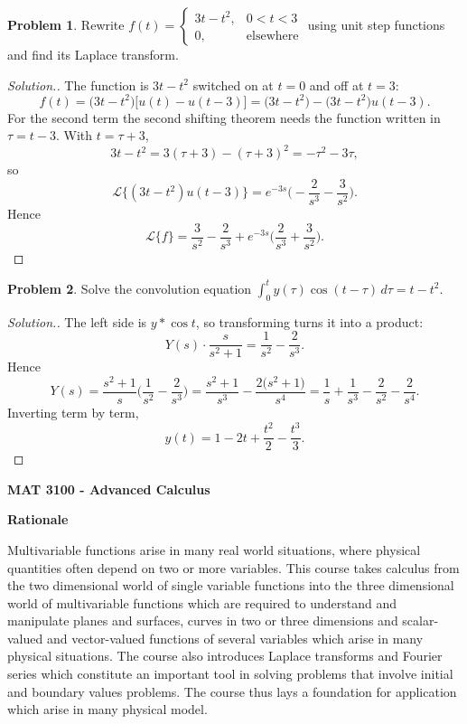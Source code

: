 \documentclass[11pt,a4paper]{article}
\theoremstyle{definition}
\newtheorem{problemx}{Problem}[subsection]
\newenvironment{problem}{\begin{problemx}}{\end{problemx}}
\newenvironment{solution}
  {\renewcommand{\qedsymbol}{}\begin{proof}[\textit{Solution}.]}
  {\end{proof}}
\begin{document}
\begin{problem}
Rewrite
$f(t) = \begin{cases}3t-t^2, & 0<t<3\\ 0, & \text{elsewhere}\end{cases}$
using unit step functions and find its Laplace transform.
\end{problem}
\begin{solution}
The function is $3t-t^2$ switched on at $t=0$ and off at $t=3$:
$$f(t) = \big(3t-t^2\big)\Big[u(t)-u(t-3)\Big]
= \big(3t-t^2\big) - \big(3t-t^2\big)u(t-3).$$
For the second term the second shifting theorem needs the function written in
$\tau = t-3$. With $t = \tau+3$,
$$3t-t^2 = 3(\tau+3)-(\tau+3)^2 = -\tau^2-3\tau ,$$
so
$$\mathcal{L}\big\{(3t-t^2)u(t-3)\big\}
= e^{-3s}\Big(-\frac{2}{s^3} - \frac{3}{s^2}\Big).$$
Hence
$$\mathcal{L}\{f\} = \frac{3}{s^2} - \frac{2}{s^3}
+ e^{-3s}\Big(\frac{2}{s^3} + \frac{3}{s^2}\Big).$$
\end{solution}

\begin{problem}
Solve the convolution equation
$\displaystyle{\int_0^t y(\tau)\cos(t-\tau)\,d\tau = t-t^2}$.
\end{problem}
\begin{solution}
The left side is $y * \cos t$, so transforming turns it into a product:
$$Y(s)\cdot\frac{s}{s^2+1} = \frac{1}{s^2} - \frac{2}{s^3}.$$
Hence
$$Y(s) = \frac{s^2+1}{s}\Big(\frac{1}{s^2}-\frac{2}{s^3}\Big)
= \frac{s^2+1}{s^3} - \frac{2\big(s^2+1\big)}{s^4}
= \frac1s + \frac{1}{s^3} - \frac{2}{s^2} - \frac{2}{s^4}.$$
Inverting term by term,
$$y(t) = 1 - 2t + \frac{t^2}{2} - \frac{t^3}{3}.$$
\end{solution}



\pagebreak

\newpage
\thispagestyle{empty}
\textbf{MAT 3100 - Advanced Calculus}


\textbf{Rationale}


Multivariable functions arise in many real world situations, where physical quantities often depend on two or more variables. This course takes calculus from the two dimensional world of single variable functions into the three dimensional world of multivariable functions which are required to understand and manipulate planes and surfaces, curves in two or three dimensions and scalar-valued and vector-valued functions of several variables which arise in many physical situations. The course also introduces Laplace transforms and Fourier series which constitute an important tool in solving problems that involve initial and boundary values problems. The course thus lays a foundation for application which arise in many physical model.
\end{document}
